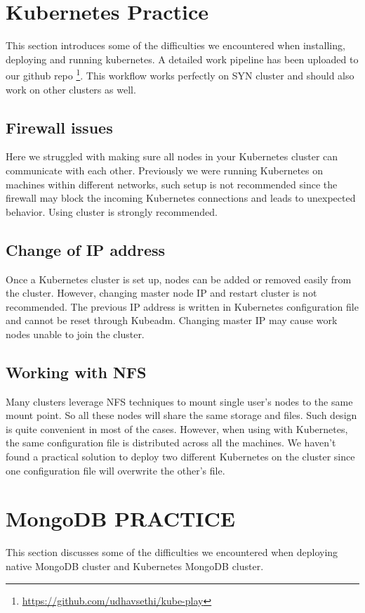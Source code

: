 \documentclass[sigconf]{acmart}
\begin{document}
\appendix

\section{Kubernetes Practice}
This section introduces some of the difficulties we encountered when installing, deploying and running kubernetes. A detailed work pipeline has been uploaded to our github repo \footnote{\url{https://github.com/udhavsethi/kube-play}}. This workflow works perfectly on SYN cluster and should also work on other clusters as well.

\subsection{Firewall issues}
Here we struggled with making sure all nodes in your Kubernetes cluster can communicate with each other. Previously we were running Kubernetes on machines within different networks, such setup is not recommended since the firewall may block the incoming Kubernetes connections and leads to unexpected behavior. Using cluster is strongly recommended.

\subsection{Change of IP address}
Once a Kubernetes cluster is set up, nodes can be added or removed easily from the cluster. However, changing master node IP and restart cluster is not recommended. The previous IP address is written in Kubernetes configuration file and cannot be reset through Kubeadm. Changing master IP may cause work nodes unable to join the cluster.

\subsection{Working with NFS}
Many clusters leverage NFS techniques to mount single user's nodes to the same mount point. So all these nodes will share the same storage and files. Such design is quite convenient in most of the cases. However, when using with Kubernetes, the same configuration file is distributed across all the machines. We haven't found a practical solution to deploy two different Kubernetes on the cluster since one configuration file will overwrite the other's file.

\section{MongoDB PRACTICE}
This section discusses some of the difficulties we encountered when deploying native MongoDB cluster and Kubernetes MongoDB cluster.
\end{document}

